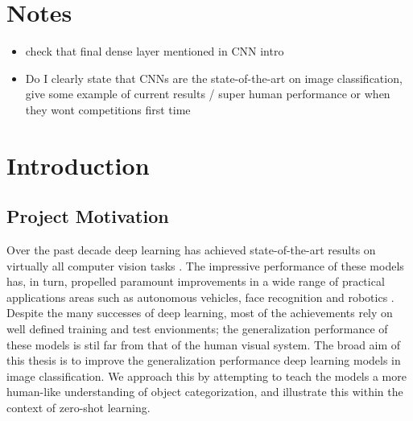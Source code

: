 \documentclass[12pt]{report}
\begin{document}
\chapter{Notes}
\begin{itemize}
    \item check that final dense layer mentioned in CNN intro
    \item Do I clearly state that CNNs are the state-of-the-art on image classification, give some example of current results / super human performance or when they wont competitions first time
\end{itemize}

\chapter[Introduction]{Introduction\raisebox{.3\baselineskip}{\normalsize\footnotemark}}

\section{Project Motivation}
Over the past decade deep learning has achieved state-of-the-art results on virtually all computer vision tasks \cite{Goodfellow2016}. The impressive performance of these models has, in turn, propelled paramount improvements in a wide range of practical applications areas such as autonomous vehicles\cite{Bojarski2016}, face recognition \cite{Taigman2014} and robotics \cite{Finn2015}\cite{Ganegedara2017}. Despite the many successes of deep learning, most of the achievements rely on well defined training and test envionments; the generalization performance of these models is stil far from that of the human visual system. The broad aim of this thesis is to improve the generalization performance deep learning models in image classification. We approach this by attempting to teach the models a more human-like understanding of object categorization, and illustrate this within the context of zero-shot learning.
\end{document}
